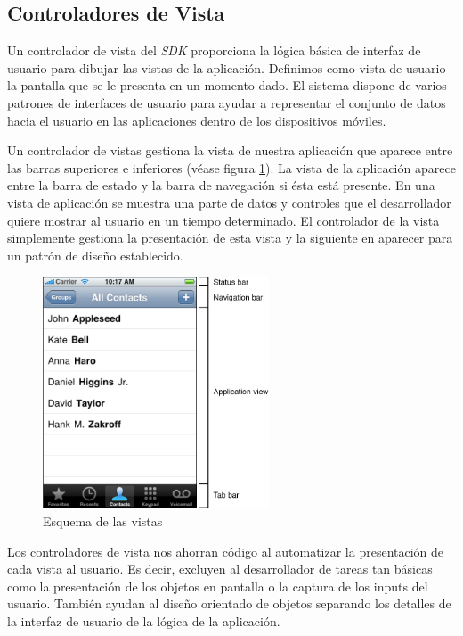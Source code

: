 \subsection{Controladores de Vista}	   
 
 Un controlador de vista del \emph{SDK} proporciona la lógica básica de interfaz de usuario para dibujar las vistas de la aplicación. Definimos como vista de usuario la pantalla que se le presenta en un momento dado. El sistema dispone de varios patrones de interfaces de usuario para ayudar a representar el conjunto de datos hacia el usuario en las aplicaciones dentro de los dispositivos móviles. 
 
  Un controlador de vistas gestiona la vista de nuestra aplicación que aparece entre las barras superiores e inferiores (véase figura \ref{fig:layout-of-views}).
  La vista de la aplicación aparece entre la barra de estado y la barra de navegación si ésta está presente. En una vista de aplicación se muestra una parte de datos y controles que el desarrollador quiere mostrar al usuario en un tiempo determinado. El controlador de la vista simplemente gestiona la presentación de esta vista y la siguiente en aparecer para un patrón de diseño establecido.
 
 \begin{figure} [h]
  \centering
    \includegraphics[width=0.6\textwidth]{./images/vc-areas.jpg}
  \caption{Esquema de las vistas }
  \label{fig:layout-of-views}
\end{figure} 
 
 Los controladores de vista nos ahorran código al automatizar la presentación de cada vista al usuario. Es decir, excluyen al desarrollador de tareas tan básicas como la presentación de los objetos en pantalla o la captura de los inputs del usuario. También ayudan al diseño orientado de objetos separando los detalles de la interfaz de usuario de la lógica de la aplicación.
  
